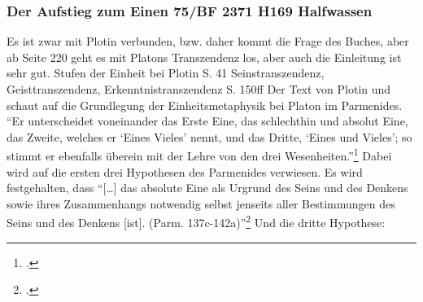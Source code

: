\subsubsection*{Der Aufstieg zum Einen 75/BF 2371 H169 Halfwassen}
Es ist zwar mit Plotin verbunden, bzw. daher kommt die Frage des Buches, aber ab Seite 220 geht es mit Platons Transzendenz los, aber auch die Einleitung ist sehr gut.
Stufen der Einheit bei Plotin S. 41
Seinstranszendenz, Geisttranszendenz, Erkenntnistranszendenz S. 150ff
Der Text von Plotin und schaut auf die Grundlegung der Einheitsmetaphysik bei Platon im Parmenides. 
\enquote{Er unterscheidet voneinander das Erste Eine, das schlechthin und absolut Eine, das Zweite, welches er \enquote{Eines Vieles} nennt, und das Dritte, \enquote{Eines und Vieles}; so stimmt er ebenfalls überein mit der Lehre von den drei Wesenheiten.}\footcite[][S. 187f.]{halfwassenaufstieg2006}
Dabei wird auf die ersten drei Hypothesen des Parmenides verwiesen. Es wird festgehalten, dass \enquote{[\dots] das absolute Eine als Urgrund des Seins und des Denkens sowie ihres Zusammenhangs notwendig selbst jenseits aller Bestimmungen des Seins und des Denkens [ist]. (Parm. 137c-142a)}\footcite[vgl.][S. 188f.]{halfwassenaufstieg2006}
Und die dritte Hypothese:

